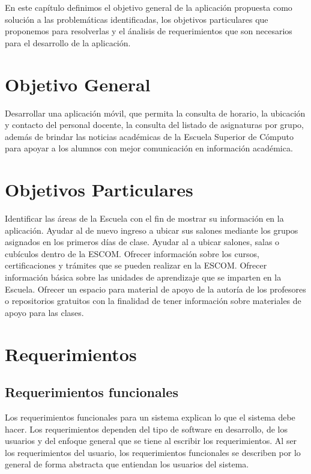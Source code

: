 En este capítulo definimos el objetivo general de la aplicación propuesta como solución a las problemáticas identificadas, los objetivos particulares que proponemos para resolverlas y el ánalisis de requerimientos que son necesarios para el desarrollo de la aplicación.

\section{Objetivo General}

	Desarrollar una aplicación móvil, que permita la consulta de horario, la ubicación y contacto del personal docente, la consulta del listado de asignaturas por grupo, además de brindar las noticias académicas de la Escuela Superior de Cómputo para apoyar a los alumnos con mejor comunicación en información académica.
	
	\section{Objetivos Particulares}	
	
	
	
	\begin{UClist}
		\UCli Identificar las áreas de la Escuela con el fin de mostrar su información en la aplicación.
		\UCli Ayudar al  de nuevo ingreso a ubicar sus salones mediante los grupos asignados en los primeros días de clase.
		\UCli Ayudar al  a ubicar salones, salas o cubículos dentro de la ESCOM.
		\UCli Ofrecer información sobre los cursos, certificaciones y trámites que se pueden realizar en la ESCOM.
		\UCli Ofrecer información básica sobre las unidades de aprendizaje que se imparten en la Escuela.
		\UCli Ofrecer un espacio para material de apoyo de la autoría de los profesores o repositorios gratuitos con la finalidad de tener información sobre materiales de apoyo para las clases.
	\end{UClist}
	
	\section{Requerimientos}
	\subsection{Requerimientos funcionales}
	
	Los requerimientos funcionales para un sistema explican lo que el sistema debe hacer. Los requerimientos dependen del tipo de software en desarrollo, de los usuarios y del enfoque general que se tiene al escribir los requerimientos. Al ser los requerimientos del usuario, los requerimientos funcionales se describen por lo general de forma abstracta que entiendan los usuarios del sistema. \cite{15}
	
